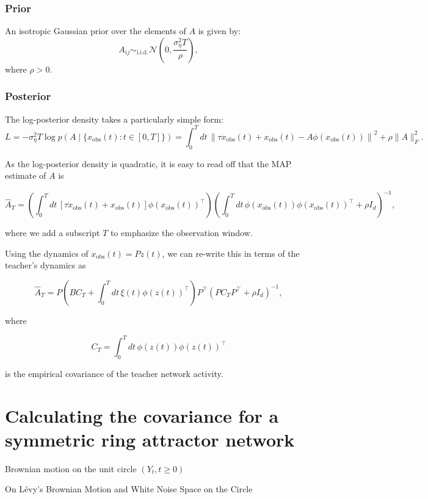 \documentclass{article}
\theoremstyle{definition} \newtheorem{definition}{Definition}
\theoremstyle{remark} \newtheorem{remark}{Remark}
\newcounter{ct}
\begin{document}
\subsubsection{Prior}
An isotropic Gaussian prior over the elements of \( A \) is given by:  
\[
A_{ij} \sim_{\text{i.i.d.}} \mathcal{N} \left( 0, \frac{\sigma^2_{\eta} T}{\rho} \right),
\]
where \( \rho > 0 \).


\subsubsection{Posterior}
The log-posterior density takes a particularly simple form:
\[
L = -\sigma^2_{\eta} T \log p\left(A \mid \{x_{\text{obs}}(t) : t \in [0, T]\} \right) = \int_{0}^{T} dt \, \left\| \tau \dot{x}_{\text{obs}}(t) + x_{\text{obs}}(t) - A \phi(x_{\text{obs}}(t)) \right\|^2 + \rho \|A\|^2_F.
\]



As the log-posterior density is quadratic, it is easy to read off that the MAP estimate of \( A \) is 

\[
\hat{A}_T = \left( \int_{0}^{T} dt \, \left[ \tau \dot{x}_{\text{obs}}(t) + x_{\text{obs}}(t) \right] \phi(x_{\text{obs}}(t))^\top \right) 
\left( \int_{0}^{T} dt \, \phi(x_{\text{obs}}(t)) \phi(x_{\text{obs}}(t))^\top + \rho I_d \right)^{-1},
\]

where we add a subscript \( T \) to emphasize the observation window. 

Using the dynamics of \( x_{\text{obs}}(t) = P z(t) \), we can re-write this in terms of the teacher’s dynamics as

\[
\hat{A}_T = P \left( B C_T + \int_{0}^{T} dt \, \xi(t) \phi(z(t))^\top \right) P^\top 
\left( P C_T P^\top + \rho I_d \right)^{-1},
\]

where

\[
C_T = \int_{0}^{T} dt \, \phi(z(t)) \phi(z(t))^\top
\]

is the empirical covariance of the teacher network activity.



\section{Calculating the covariance for a symmetric ring attractor network}

Brownian motion on the unit circle \((Y_t , t \geq 0)\) \citep{liu2012stochastic}

On L\'evy’s Brownian Motion and White Noise Space on the Circle \citep{huang2021levy}
\end{document}
